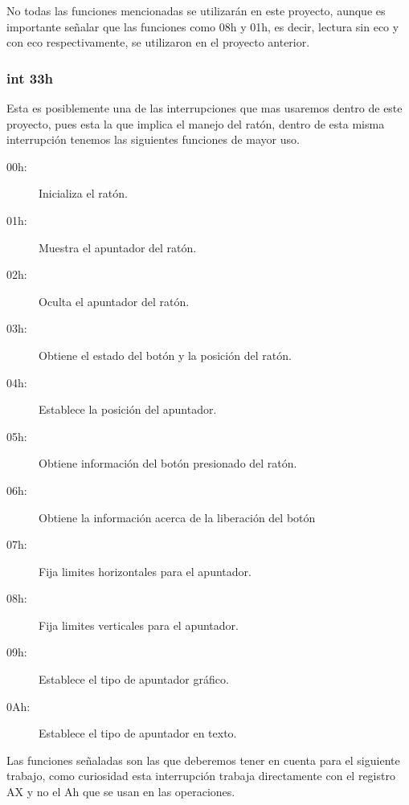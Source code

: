 \documentclass[letterpaper,12 pt,titlepage]{article}
\begin{document}
    No todas las funciones mencionadas se utilizarán en este proyecto, aunque es importante señalar que las funciones como 08h y 01h, es decir, lectura sin eco y con eco respectivamente, se utilizaron en el proyecto anterior.

    \subsubsection{int 33h} 
    
    Esta es posiblemente una de las interrupciones que mas usaremos dentro de este proyecto, pues esta la que implica el manejo del ratón, dentro de esta misma interrupción tenemos las siguientes funciones de mayor uso.

    \begin{center}
        \begin{minipage}{0.85\linewidth}
            \begin{description}
                \item[00h:] Inicializa el ratón.
                \item[01h:] Muestra el apuntador del ratón.
                \item[02h:] Oculta el apuntador del ratón.
                \item[03h:] Obtiene el estado del botón y la posición del ratón.
                \item[04h:] Establece la posición del apuntador.
                \item[05h:] Obtiene información del botón presionado del ratón.
                \item[06h:] Obtiene la información acerca de la liberación del botón
                \item[07h:] Fija limites horizontales para el apuntador.
                \item[08h:] Fija limites verticales para el apuntador.
                \item[09h:] Establece el tipo de apuntador gráfico.
                \item[0Ah:] Establece el tipo de apuntador en texto.
            \end{description}
        \end{minipage}
    \end{center}

    Las funciones señaladas son las que deberemos tener en cuenta para el siguiente trabajo, como curiosidad esta interrupción trabaja directamente con el registro AX y no el Ah que se usan en las operaciones.
\end{document}
